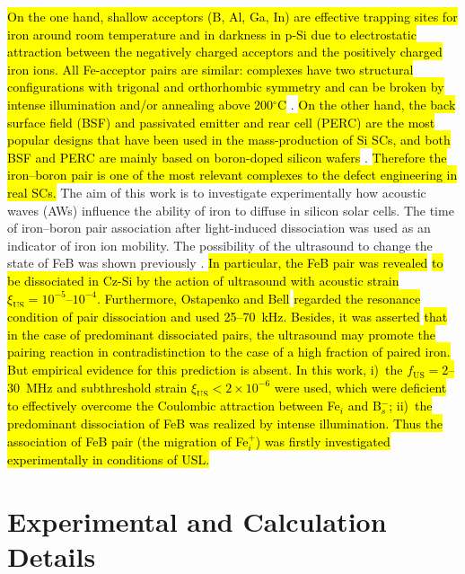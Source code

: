 \documentclass[sn-mathphys]{sn-jnl}%
\theoremstyle{thmstyleone}%
\theoremstyle{thmstyletwo}%
\theoremstyle{thmstylethree}%
\begin{document}
\hl{ On the one hand, shallow acceptors (B, Al, Ga, In) are effective trapping sites for iron around room temperature
and in darkness in p-Si due to electrostatic attraction between the negatively charged
acceptors and the positively charged iron ions.
All Fe-acceptor pairs are similar:
complexes have two structural configurations
with trigonal and orthorhombic symmetry and can be broken by
intense illumination and/or annealing above 200$^\circ$C} \cite{Istratov1999,FeBKinAPL2013}.
\hl{ On the other hand, the back surface field (BSF) and passivated emitter and rear cell (PERC)
are the most popular designs that have been used in the mass-production of Si SCs,
and both BSF and PERC are mainly  based on boron-doped silicon wafers }\cite{SCRev2020,GreenRew2019}.
\hl{ Therefore the iron--boron pair is one of the most relevant complexes to the defect engineering in real SCs.}
The aim of this work is to investigate experimentally how acoustic waves (AWs) influence the ability of iron to diffuse in silicon solar cells.
The time of iron--boron pair association after  light-induced dissociation was used as an indicator of iron ion mobility.
The possibility of the ultrasound to  change the state of FeB was shown previously  \cite{Ostapenko1994APL,Ostapenko1995}.
\hl{
In particular, the
FeB pair was revealed} \cite{Ostapenko1995}
\hl{ to be dissociated in Cz-Si by the action of ultrasound with acoustic strain $\xi_\mathrm{US}=10^{-5}$--$10^{-4}$.
Furthermore, Ostapenko and Bell} \cite{Ostapenko1995} \hl{regarded the resonance condition of pair dissociation and used 25--70~kHz.
Besides, it was asserted} \cite{Ostapenko1994APL} \hl{that in the case of
predominant dissociated pairs, the ultrasound may promote the pairing reaction in contradistinction to the case of a
high fraction of paired iron.
But  empirical evidence  for this prediction  is absent.
In this work,
i)~the $f_\mathrm{US}=$2--30~MHz and subthreshold strain $\xi_\mathrm{US}<2\times10^{-6}$ were used, which were deficient to effectively overcome the Coulombic attraction between Fe$_i$ and B$_s^-$;
ii)~the predominant  dissociation of FeB was realized by intense illumination.
Thus the association of FeB pair (the migration  of Fe$_i^+$) was firstly investigated experimentally in conditions of USL.}


\section{Experimental and Calculation Details}
\label{sec:1}
\end{document}
